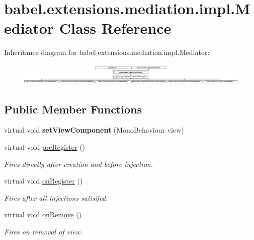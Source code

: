 \hypertarget{classbabel_1_1extensions_1_1mediation_1_1impl_1_1_mediator}{\section{babel.\-extensions.\-mediation.\-impl.\-Mediator Class Reference}
\label{classbabel_1_1extensions_1_1mediation_1_1impl_1_1_mediator}
}
Inheritance diagram for babel.\-extensions.\-mediation.\-impl.\-Mediator\-:\begin{figure}[H]
\begin{center}
\leavevmode
\includegraphics[height=1.051643cm]{classbabel_1_1extensions_1_1mediation_1_1impl_1_1_mediator}
\end{center}
\end{figure}
\subsection*{Public Member Functions}
\begin{DoxyCompactItemize}
\item 
\hypertarget{classbabel_1_1extensions_1_1mediation_1_1impl_1_1_mediator_a9a4303b8bb48bb287e04b7254f5fcc0e}{virtual void {\bfseries set\-View\-Component} (Mono\-Behaviour view)}\label{classbabel_1_1extensions_1_1mediation_1_1impl_1_1_mediator_a9a4303b8bb48bb287e04b7254f5fcc0e}

\item 
\hypertarget{classbabel_1_1extensions_1_1mediation_1_1impl_1_1_mediator_a91c14111a5222c25c37e6e6289a75c2a}{virtual void \hyperlink{classbabel_1_1extensions_1_1mediation_1_1impl_1_1_mediator_a91c14111a5222c25c37e6e6289a75c2a}{pre\-Register} ()}\label{classbabel_1_1extensions_1_1mediation_1_1impl_1_1_mediator_a91c14111a5222c25c37e6e6289a75c2a}

\begin{DoxyCompactList}\small\item\em Fires directly after creation and before injection. \end{DoxyCompactList}\item 
virtual void \hyperlink{classbabel_1_1extensions_1_1mediation_1_1impl_1_1_mediator_a693800cf98ef09c660de249436108d9a}{on\-Register} ()
\begin{DoxyCompactList}\small\item\em Fires after all injections satisifed. \end{DoxyCompactList}\item 
virtual void \hyperlink{classbabel_1_1extensions_1_1mediation_1_1impl_1_1_mediator_a8b818665eda883eac66c83b8468007e9}{on\-Remove} ()
\begin{DoxyCompactList}\small\item\em Fires on removal of view. \end{DoxyCompactList}\end{DoxyCompactItemize}
